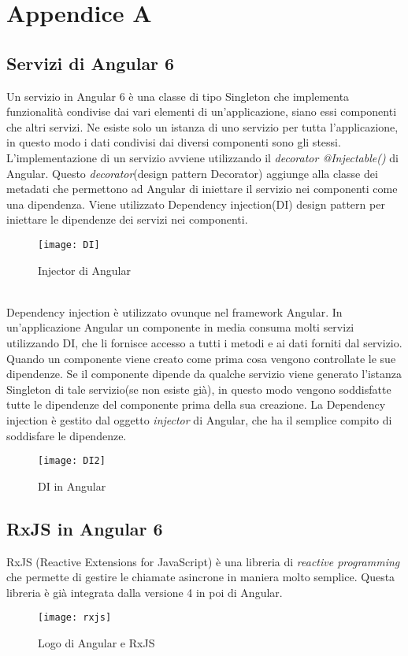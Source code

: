 
\chapter{Appendice A}
\section{Servizi di Angular 6}
 Un servizio in Angular 6 è una classe di tipo \gls{Singleton} che implementa funzionalità condivise dai vari elementi di un’applicazione, siano essi componenti che altri servizi.
Ne esiste solo un istanza di uno servizio per tutta l'applicazione, in questo modo i dati condivisi dai diversi componenti sono gli stessi.
\\

L'implementazione di un servizio avviene utilizzando il \emph{decorator @Injectable()} di Angular. Questo \emph{decorator}(design pattern \gls{Decorator}) aggiunge alla classe dei metadati che permettono ad Angular di iniettare il servizio nei componenti come una dipendenza. Viene utilizzato Dependency injection(\gls{DI}) design pattern per iniettare le dipendenze dei servizi nei componenti. 
\begin{figure}[!h] 
	\centering 
	\texttt{[image: DI]} 
	\caption{Injector di Angular}
\end{figure}
\\

Dependency injection è utilizzato ovunque nel framework Angular. In un'applicazione Angular un componente in media consuma molti servizi utilizzando DI, che li fornisce accesso a tutti i metodi e ai dati forniti dal servizio. 
\\ 

Quando un componente viene creato come prima cosa vengono controllate le sue dipendenze. Se il componente dipende da qualche servizio viene generato l'istanza Singleton di tale servizio(se non esiste già), in questo modo vengono soddisfatte tutte le dipendenze del componente prima della sua creazione. 
La Dependency injection è gestito dal oggetto \emph{injector} di Angular, che ha il semplice compito di soddisfare le dipendenze. 
\begin{figure}[!ht] 
	\centering 
	\texttt{[image: DI2]} 
	\caption{DI in Angular}
\end{figure}
\section{RxJS in Angular 6}
RxJS (Reactive Extensions for JavaScript) è una libreria di \emph{reactive programming} che permette di gestire le chiamate asincrone in maniera molto semplice. Questa libreria è già integrata dalla versione 4 in poi di Angular. 
\begin{figure}[!ht] 
	\centering 
	\texttt{[image: rxjs]} 
	\caption{Logo di Angular e RxJS}
\end{figure}

